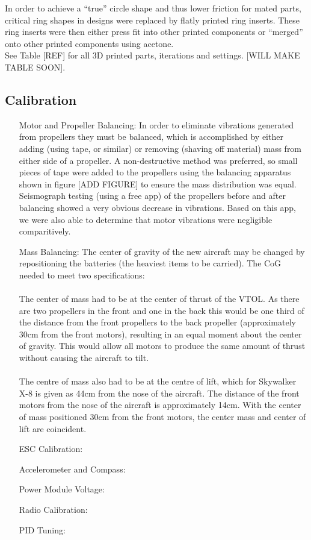In order to achieve a ``true'' circle shape and thus lower friction for mated parts, critical ring shapes in designs were replaced by flatly printed ring inserts. These ring inserts were then either press fit into other printed components or ``merged'' onto other printed components using acetone.\\

See Table [REF] for all 3D printed parts, iterations and settings.  [WILL MAKE TABLE SOON].

	

\subsection{Calibration}
\begin{itemize}
	\item[Motor and Propeller Balancing:] In order to eliminate vibrations generated from propellers they must be balanced, which is accomplished by either adding (using tape, or similar) or removing (shaving off material) mass from either side of a propeller. A non-destructive method was preferred, so small pieces of tape were added to the propellers using the balancing apparatus shown in figure [ADD FIGURE] to ensure the mass distribution was equal.  Seismograph testing (using a free app) of the propellers before and after balancing showed a very obvious decrease in vibrations. Based on this app, we were also able to determine that motor vibrations were negligible comparitively.
	\item[Mass Balancing:]  The center of gravity of the new aircraft may be changed by repositioning the batteries (the heaviest items to be carried). The CoG needed to meet two specifications:
	\\\\The center of mass had to be at the center of thrust of the VTOL. As there are two propellers in the front and one in the back this would be one third of the distance from the front propellers to the back propeller (approximately 30cm from the front motors), resulting in an equal moment about the center of gravity. This would allow all motors to produce the same amount of thrust without causing the aircraft to tilt.
	\\\\The centre of mass also had to be at the centre of lift, which for Skywalker X-8 is given as 44cm from the nose of the aircraft. The distance of the front motors from the nose of the aircraft is approximately 14cm. With the center of mass positioned 30cm from the front motors, the center mass and center of lift are coincident.
	\item[ESC Calibration:]
	\item[Accelerometer and Compass:]
	\item[Power Module Voltage:]
	\item[Radio Calibration:]
	\item[PID Tuning:]
		
\end{itemize}
